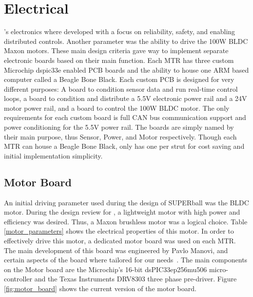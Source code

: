 \section{Electrical}
\SB{}'s electronics where developed with a focus on reliability, safety, and enabling distributed controls.
Another parameter was the ability to drive the 100W BLDC Maxon motors.
These main design criteria gave way to implement separate electronic boards based on their main function.
Each MTR has three custom Microchip dspic33e enabled PCB boards and the ability to house one ARM based computer called a Beagle Bone Black.
Each custom PCB is designed for very different purposes: A board to condition sensor data and run real-time control loops, a board to condition and distribute a 5.5V electronic power rail and a 24V motor power rail, and a board to control the 100W BLDC motor. 
The only requirements for each custom board is full CAN bus communication support and power conditioning for the 5.5V power rail.
The boards are simply named by their main purpose, thus Sensor, Power, and Motor respectively.
Though each MTR can house a Beagle Bone Black, \SB{} only has one per strut for cost saving and initial implementation simplicity. 

\subsection{Motor Board}
An initial driving parameter used during the design of SUPERball was the BLDC motor. 
During the design review for \SB{}, a lightweight motor with high power and efficiency was desired.
Thus, a Maxon brushless motor was a logical choice.
Table \ref{motor_parameters} shows the electrical properties of this motor.
In order to effectively drive this motor, a dedicated motor board was used on each MTR.
The main development of this board was engineered by Pavlo Manovi, and certain aspects of the board where tailored for our needs~\cite{Pavlo2014}.
The main components on the Motor board are the Microchip's 16-bit dsPIC33ep256mu506 micro-controller and the Texas Instruments DRV8303 three phase pre-driver.
Figure \ref{fig:motor_board} shows the current version of the motor board.

